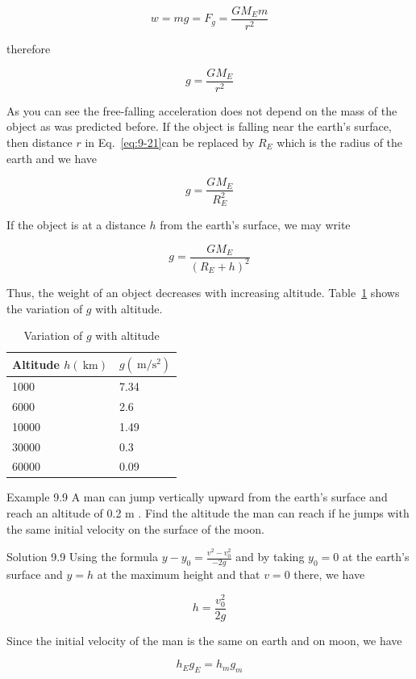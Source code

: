\documentclass[10pt]{article}
\numberwithin{equation}{section}
\begin{document}
$$
w=m g=F_{g}=\frac{G M_{E} m}{r^{2}}
$$

therefore


\begin{equation}
g=\frac{G M_{E}}{r^{2}} \label{eq:9-21}
\end{equation}


As you can see the free-falling acceleration does not depend on the mass of the object as was predicted before. If the object is falling near the earth's surface, then distance $r$ in Eq.~\eqref{eq:9-21}can be replaced by $R_{E}$ which is the radius of the earth and we have

$$
g=\frac{G M_{E}}{R_{E}^{2}}
$$

If the object is at a distance $h$ from the earth's surface, we may write

$$
g=\frac{G M_{E}}{\left(R_{E}+h\right)^{2}}
$$

Thus, the weight of an object decreases with increasing altitude. Table~\ref{tab:9-1} shows the variation of $g$ with altitude.

\begin{table}[htbp]
\centering
\begin{tabular}{l|l}
\hline
Altitude $h(\mathrm{~km})$ & $g\left(\mathrm{~m} / \mathrm{s}^{2}\right)$ \\
\hline
1000 & 7.34 \\
\hline
6000 & 2.6 \\
\hline
10000 & 1.49 \\
\hline
30000 & 0.3 \\
\hline
60000 & 0.09 \\
\hline
\end{tabular}
\caption{Variation of $g$ with altitude}\label{tab:9-1}
\end{table}

Example 9.9 A man can jump vertically upward from the earth's surface and reach an altitude of 0.2 m . Find the altitude the man can reach if he jumps with the same initial velocity on the surface of the moon.

Solution 9.9 Using the formula $y-y_{0}=\frac{v^{2}-v_{0}^{2}}{-2 g}$ and by taking $y_{0}=0$ at the earth's surface and $y=h$ at the maximum height and that $v=0$ there, we have

$$
h=\frac{v_{0}^{2}}{2 g}
$$

Since the initial velocity of the man is the same on earth and on moon, we have

$$
h_{E} g_{E}=h_{m} g_{m}
$$
\end{document}
